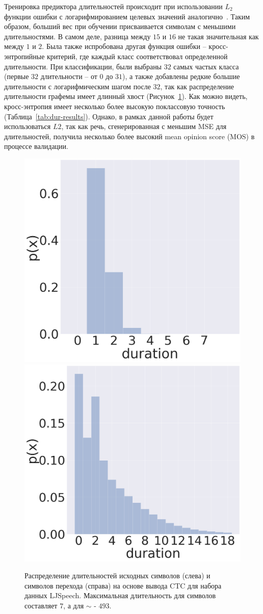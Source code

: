 Тренировка предиктора длительностей происходит при использовании $L_2$ функции ошибки с логарифмированием целевых значений аналогично~\cite{fastspeech}. Таким образом, больший вес при обучении присваивается символам с меньшими длительностями. В самом деле, разница между $15$ и $16$ не такая значительная как между $1$ и $2$. Была также испробована другая функция ошибки -- кросс-энтропийные критерий, где каждый класс соответствовал определенной длительности. При классификации, были выбраны $32$ самых частых класса (первые $32$ длительности -- от $0$ до $31$), а также добавлены редкие большие длительности с логарифмическим шагом после $32$, так как распределение длительности графемы имеет длинный хвост (Рисунок~\ref{fig:durs-dist}). Как можно видеть, кросс-энтропия имеет несколько более высокую поклассовую точность (Таблица~\ref{tab:dur-results}). Однако, в рамках данной работы будет использоваться $L2$, так как речь, сгенерированная с меньшим MSE для длительностей, получила несколько более высокий mean opinion score (MOS) в процессе валидации.

\begin{figure}[!ht]
\centering
\includegraphics[width=.48\linewidth]{images/durs-dist.png}
\includegraphics[width=.48\linewidth]{images/blanks-dist.png}
\caption{Распределение длительностей исходных символов (слева) и символов перехода (справа) на основе вывода CTC для набора данных LJSpeech. Максимальная длительность для символов составляет $7$, а для $\sim$ - $493$.}
\label{fig:durs-dist}
\end{figure}

